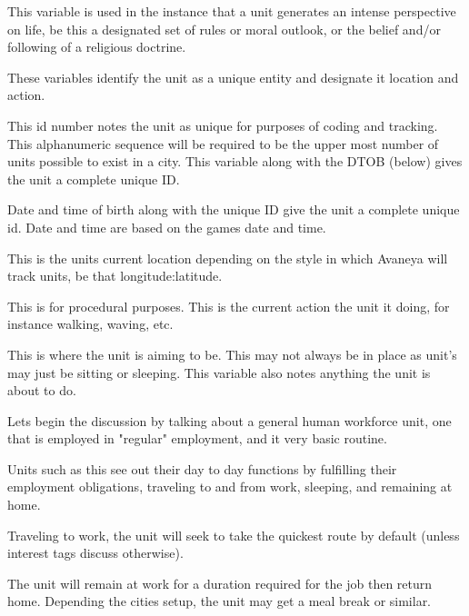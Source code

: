 This variable is used in the instance that a unit generates an intense perspective on life, be this a designated set of rules or moral outlook, or the belief and/or following of a religious doctrine.



These variables identify the unit as a unique entity and designate it location and action.

This id number notes the unit as unique for purposes of coding and tracking. This alphanumeric sequence will be required to be the upper most number of units possible to exist in a city. This variable along with the DTOB (below) gives the unit a complete unique ID.

Date and time of birth along with the unique ID give the unit a complete unique id. Date and time are based on the games date and time.

This is the units current location depending on the style in which Avaneya will track units, be that longitude:latitude.

This is for procedural purposes. This is the current action the unit it doing, for instance walking, waving, etc.

This is where the unit is aiming to be. This may not always be in place as unit's may just be sitting or sleeping. This variable also notes anything the unit is about to do.











Lets begin the discussion by talking about a general human workforce unit, one that is employed in "regular" employment, and it very basic routine.

Units such as this see out their day to day functions by fulfilling their employment obligations, traveling to and from work, sleeping, and remaining at home.

Traveling to work, the unit will seek to take the quickest route by default (unless interest tags discuss otherwise).

The unit will remain at work for a duration required for the job then return home. Depending the cities setup, the unit may get a meal break or similar.

